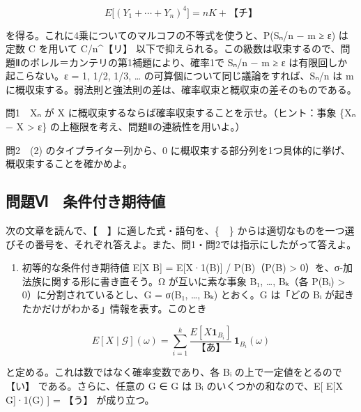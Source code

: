 \documentclass[
  10pt,
  a4paper,
]{article}
\providecommand{\tightlist}{%
  \setlength{\itemsep}{0pt}\setlength{\parskip}{0pt}}
\begin{document}
\[E\big[(Y_1 + \cdots + Y_n)^4\big] = nK + \text{【チ】}\]

を得る。これに4乗についてのマルコフの不等式を使うと、P(\textbar S{\fallbackfont ₙ}/n
− m\textbar{} ≥ ε) は定数 C を用いて C/n\^{}【リ】
以下で抑えられる。この級数は収束するので、問題Ⅱのボレル＝カンテリの第1補題により、確率1で
\textbar S{\fallbackfont ₙ}/n − m\textbar{} ≥ ε
は有限回しか起こらない。ε = 1, 1/2, 1/3, \ldots{}
の可算個について同じ議論をすれば、S{\fallbackfont ₙ}/n は m
に概収束する。弱法則と強法則の差は、確率収束と概収束の差そのものである。

問1　X{\fallbackfont ₙ} が X
に概収束するならば確率収束することを示せ。（ヒント：事象
\{\textbar X{\fallbackfont ₙ} − X\textbar{} \textgreater{} ε\}
の上極限を考え、問題Ⅱの連続性を用いよ。）

問2　(2) のタイプライター列から、0
に概収束する部分列を1つ具体的に挙げ、概収束することを確かめよ。

\hypertarget{ux554fux984cux2175-ux6761ux4ef6ux4ed8ux304dux671fux5f85ux5024}{%
\subsection{問題Ⅵ　条件付き期待値}\label{ux554fux984cux2175-ux6761ux4ef6ux4ed8ux304dux671fux5f85ux5024}}

次の文章を読んで、【　】に適した式・語句を、\{　\}
からは適切なものを一つ選びその番号を、それぞれ答えよ。また、問1・問2では指示にしたがって答えよ。

\begin{enumerate}
\def\labelenumi{(\arabic{enumi})}
\tightlist
\item
  初等的な条件付き期待値 E{[}X \textbar{} B{]} = E{[}X·1(B){]} /
  P(B)（P(B) \textgreater{} 0）を、σ-加法族に関する形に書き直そう。Ω
  が互いに素な事象 B{\fallbackfont ₁}, \ldots, B{\fallbackfont ₖ}（各
  P(B{\fallbackfont ᵢ}) \textgreater{} 0）に分割されているとし、G =
  σ(B{\fallbackfont ₁}, \ldots, B{\fallbackfont ₖ}) とおく。G は「どの
  B{\fallbackfont ᵢ} が起きたかだけがわかる」情報を表す。このとき
\end{enumerate}

\[E[X \mid \mathcal{G}](\omega) = \sum_{i=1}^{k} \frac{E[X \mathbf{1}_{B_i}]}{\text{【あ】}}\, \mathbf{1}_{B_i}(\omega)\]

と定める。これは数ではなく確率変数であり、各 B{\fallbackfont ᵢ}
の上で一定値をとるので 【い】 である。さらに、任意の G ∈ G は
B{\fallbackfont ᵢ} のいくつかの和なので、E{[} E{[}X \textbar{} G{]}·1(G)
{]} = 【う】 が成り立つ。
\end{document}
